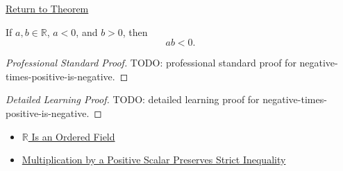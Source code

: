 \newpage
{}
\label{prf:negative-times-positive-is-negative}

\begin{remark*}[Return]
\hyperref[lem:negative-times-positive-is-negative]{Return to Theorem}
\end{remark*}

\begin{lemma*}
If $a,b\in\mathbb{R}$, $a<0$, and $b>0$, then
\[
ab<0.
\]
\end{lemma*}

\begin{proof}[Professional Standard Proof]
\LRAProofBodyStart
TODO: professional standard proof for negative-times-positive-is-negative.
\end{proof}

\begin{proof}[Detailed Learning Proof]
\LRAProofBodyStart
TODO: detailed learning proof for negative-times-positive-is-negative.
\end{proof}

\begin{remark*}
\end{remark*}

\begin{dependencies}
\begin{itemize}
  \item \hyperref[thm:r-is-an-ordered-field]{$\mathbb{R}$ Is an Ordered Field}
  \item \hyperref[thm:ineq-multiply-positive]{Multiplication by a Positive Scalar Preserves Strict Inequality}
\end{itemize}
\end{dependencies}

\clearpage
